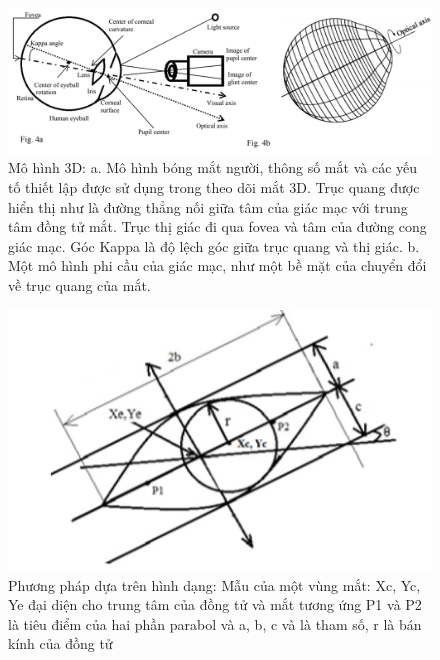 \begin{center}
    \begin{figure}[h!]
    \begin{center}
     \includegraphics[scale=0.5]{img/Model_of_a_human_eye_ball.png}
    \end{center}
    \caption{Mô hình 3D: a. Mô hình bóng mắt người, thông số mắt và các yếu tố thiết lập được sử dụng trong theo dõi mắt 3D. Trục quang được hiển thị như là đường thẳng nối giữa tâm của giác mạc với trung tâm đồng tử mắt. Trục thị giác đi qua fovea và tâm của đường cong giác mạc. Góc Kappa là độ lệch góc giữa trục quang và thị giác. b. Một mô hình phi cầu của giác mạc, như một bề mặt của chuyển đổi về trục quang của mắt. \cite{AReviewandAnalysisofEyeGazeEstimation} }
    \label{refhinh15}
    \end{figure}
\end{center} 

\begin{center}
    \begin{figure}[h!]
    \begin{center}
     \includegraphics[scale=0.5]{img/Template_of_an_eye_region.PNG}
    \end{center}
    \caption{Phương pháp dựa trên hình dạng: Mẫu của một vùng mắt: Xc, Yc, Ye đại diện cho trung tâm của đồng tử và mắt tương ứng P1 và P2 là tiêu điểm của hai phần parabol và a, b, c và  là tham số, r là bán kính của đồng tử \cite{AReviewandAnalysisofEyeGazeEstimation}}
    \label{refhinh15}
    \end{figure}
\end{center}


